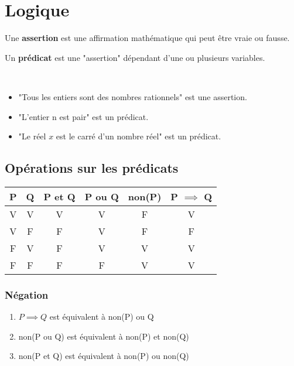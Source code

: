 \chapter{Logique}
\begin{graybox}
	\begin{definition}[Assertion]
		\par Une \textbf{assertion} est une affirmation mathématique qui peut être vraie ou fausse.
	\end{definition}
\end{graybox}

\begin{graybox}
	\begin{definition}[Prédicat]
		\par Un \textbf{prédicat} est une "assertion" dépendant d'une ou plusieurs variables.
	\end{definition}
\end{graybox}

\begin{exemple}~
\begin{itemize}
\item "Tous les entiers sont des nombres rationnels" est une assertion.
\item "L'entier n est pair" est un prédicat.
\item "Le réel $x$ est le carré d'un nombre réel" est un prédicat.
\end{itemize}
\end{exemple}
\section{Opérations sur les prédicats}
\begin{table}[h!]
\centering
\begin{tabular}{|c|c|c|c|c|c|}
\hline
P & Q & P et Q & P ou Q & non(P) & P $\implies$ Q \\
\hline
V & V & V & V & F & V \\
\hline
V & F & F & V & F & F \\
\hline
F & V & F & V & V & V \\
\hline 
F & F & F & F & V & V \\
\hline
\end{tabular}
\end{table}

\subsection{Négation}
\begin{enumerate}
\item $P \implies Q$ est équivalent à non(P) ou Q
\item non(P ou Q) est équivalent à non(P) et non(Q)
\item non(P et Q) est équivalent à non(P) ou non(Q)
\end{enumerate}

